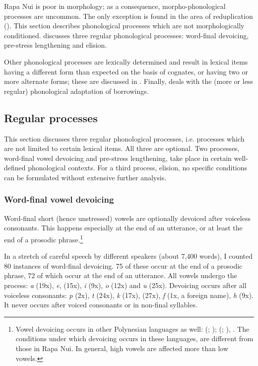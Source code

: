 Rapa Nui is poor in morphology; as a consequence, morpho-phonological processes are uncommon. The only exception is found in the area of reduplication (). This section describes phonological processes which are not morphologically conditioned.  discusses three regular phonological processes: word-final devoicing, pre-stress lengthening and elision. 

Other phonological processes are lexically determined and result in lexical items having a different form than expected on the basis of cognates, or having two or more alternate forms; these are discussed in . Finally,  deals with the (more or less regular) phonological adaptation of borrowings.

\subsection{Regular processes}\label{sec:2.5.1}

This section discusses three regular phonological processes, i.e. processes which are not limited to certain lexical items. All three are optional. Two processes, word-final vowel devoicing and pre-stress lengthening, take place in certain well-defined phonological contexts. For a third process, elision, no specific conditions can be formulated without extensive further analysis.
 
 \largerpage
\subsubsection[Word{}-final vowel devoicing]{Word-final vowel devoicing}\label{sec:2.5.1.1}
Word-final short (hence unstressed) vowels are optionally devoiced after voiceless consonants. This happens especially at the end of an utterance, or at least the end of a prosodic phrase.\footnote{\label{fn:61}Vowel devoicing occurs in other Polynesian languages as well:  (\citealt[76]{Harlow2007Maori}; \citealt[556]{Bauer1993});  (\citealt[23-25]{Tsukamoto1988}; \citealt{DeLacy2001}),  \citep[137]{Feldman1978}. The conditions under which devoicing occurs in these languages, are different from those in Rapa Nui. In general, high vowels are affected more than low vowels.}

In a stretch of careful speech by different speakers (about 7,400 words), I counted 80 instances of word-final devoicing. 75 of these occur at the end of a prosodic phrase, 72 of which occur at the end of an utterance. All vowels undergo the process: \textit{a} (19x), \textit{e}, (15x), \textit{i} (9x), \textit{o} (12x) and \textit{u} (25x). Devoicing occurs after all voiceless consonants: \textit{p} (2x), \textit{t} (24x), \textit{k} (17x), \textit{{\ꞌ}} (27x), \textit{f} (1x, a foreign name), \textit{h} (9x). It never occurs after voiced consonants or in non-final syllables. 

